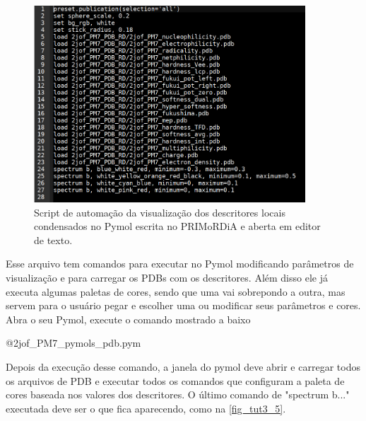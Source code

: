 \documentclass[a4paper,11pt]{refart}
\begin{document}
\hspace*{-\leftmarginwidth}
\begin{minipage}{\fullwidth}
	\begin{figure}[H]
		\begin{center}
			\includegraphics[width=4in]{images/tut3_img5}
			\caption{Script de automação da visualização dos descritores locais condensados no Pymol escrita no PRIMoRDiA e aberta em editor de texto.}
			\label{fig_tut3_3}
		\end{center}
	\end{figure}
\end{minipage}

Esse arquivo tem comandos para executar no Pymol modificando parâmetros de visualização e para carregar os PDBs com os descritores. Além disso ele já executa algumas paletas de cores, sendo que uma vai sobrepondo a outra, mas servem para o usuário pegar e escolher uma ou modificar seus parâmetros e cores. Abra o seu Pymol, execute o comando mostrado a baixo

\hspace*{-\leftmarginwidth}
\begin{minipage}{\fullwidth}
	\begin{pymol}@2jof_PM7_pymols_pdb.pym\end{pymol}
\end{minipage}

Depois da execução desse comando, a janela do pymol deve abrir e carregar todos os arquivos de PDB e executar todos os comandos que configuram a paleta de cores baseada nos valores dos descritores. O último comando de "spectrum b..." executada deve ser o que fica aparecendo, como na \autoref{fig_tut3_5}.
\end{document}
